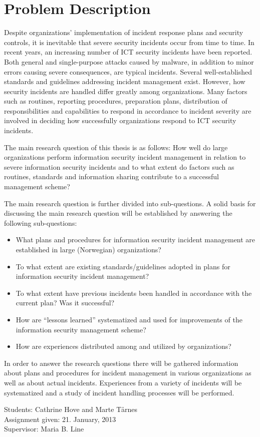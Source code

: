 \chapter*{Problem Description}
Despite organizations’ implementation of incident response plans and security controls, it is inevitable that severe security incidents occur from time to time. In recent years, an increasing number of ICT security incidents have been reported. Both general and single-purpose attacks caused by malware, in addition to minor errors causing severe consequences, are typical incidents. Several well-established standards and guidelines addressing incident management exist. However, how security incidents are handled differ greatly among organizations. Many factors such as routines, reporting procedures, preparation plans, distribution of responsibilities and capabilities to respond in accordance to incident severity are involved in deciding how successfully organizations respond to ICT security incidents. 

The main research question of this thesis is as follows:
How well do large organizations perform information security incident management in relation to severe information security incidents and to what extent do factors such as routines, standards and information sharing contribute to a successful management scheme?

The main research question is further divided into sub-questions. A solid basis for discussing the main research question will be established by answering the following sub-questions:

\begin{itemize}\itemsep-0.15cm
\item What plans and procedures for information security incident management are established in large (Norwegian) organizations?
\item To what extent are existing standards/guidelines adopted in plans for information security incident management?
\item To what extent have previous incidents been handled in accordance with the current plan? Was it successful?
\item How are “lessons learned” systematized and used for improvements of the information security management scheme?
\item How are experiences distributed among and utilized by organizations?
\end{itemize}

In order to answer the research questions there will be gathered information about plans and procedures for incident management in various organizations as well as about actual incidents. Experiences from a variety of incidents will be systematized and a study of incident handling processes will be performed.

Students: Cathrine Hove and Marte T\aa rnes \\
Assignment given: 21. January, 2013 \\
Supervisor: Maria B. Line